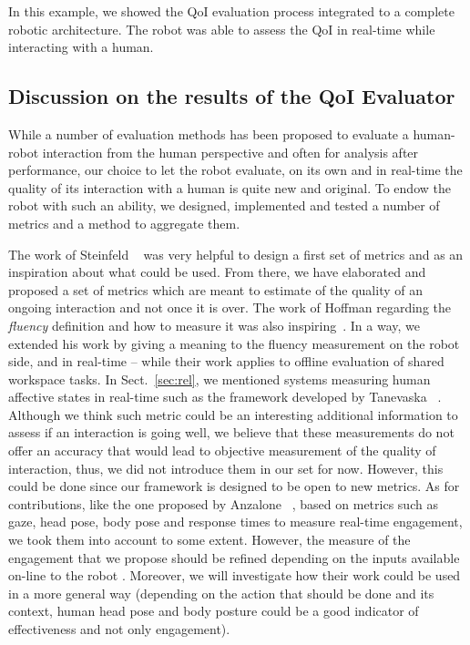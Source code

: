 \documentclass[a4paper,11pt,twoside]{StyleThese}
\begin{document}
In this example, we showed the QoI evaluation process integrated to a complete robotic architecture. The robot was able to assess the QoI in real-time while interacting with a human.

\subsection{Discussion on the results of the QoI Evaluator}
While a number of evaluation methods has been proposed to evaluate a human-robot interaction from the human perspective and often for analysis after performance, our choice to let the robot evaluate, on its own and in real-time the quality of its interaction with a human is quite new and original. To endow the robot with such an ability, we designed, implemented and tested a number of metrics and a method to aggregate them.

The work of Steinfeld \etal{}~\cite{steinfeld_2006_common} was very helpful to design a first set of metrics and as an inspiration about what could be used. From there, we have elaborated and proposed a set of metrics which are meant to estimate of the quality of an ongoing interaction and not once it is over. 
The work of Hoffman regarding the \emph{fluency} definition and how to measure it was also inspiring~\cite{hoffman2019}. In a way, we extended his work by giving a meaning to the fluency measurement on the robot side, and in real-time -- while their work applies to offline evaluation of shared workspace tasks. 
In Sect.~\ref{sec:rel}, we mentioned systems measuring human affective states in real-time such as the framework developed by Tanevaska \etal{}~\cite{tanevska:hal-01615491}. Although we think such metric could be an interesting additional information to assess if an interaction is going well, we believe that these measurements do not offer an accuracy that would lead to objective measurement of the quality of interaction, thus, we did not introduce them in our set for now. However, this could be done since our framework is designed to be open to new metrics. 
As for contributions, like the one proposed by Anzalone \etal{}~\cite{anzalone_2015_evaluating}, based on metrics such as gaze, head pose, body pose and response times to measure real-time engagement, we took them into account to some extent. However, the measure of the engagement that we propose should be refined depending on the inputs available on-line to the robot . Moreover, we will investigate how their work could be used in a more general way (\eg depending on the action that should be done and its context, human head pose and body posture could be a good indicator of effectiveness and not only engagement). 
\end{document}
